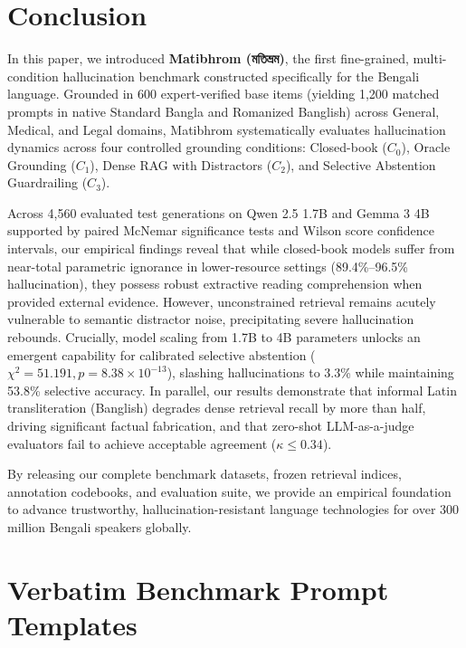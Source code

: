 \documentclass[11pt,a4paper,twocolumn]{article}
\DeclareRobustCommand{\foreignlanguage}[2]{#2}
\let\bengalifont\relax
\DeclareRobustCommand{\foreignlanguage}[2]{{\bengalifont #2}}
\DeclareRobustCommand{\foreignlanguage}[2]{#2}
\begin{document}
\section{Conclusion}
\label{sec:conclusion}

In this paper, we introduced \textbf{Matibhrom (\foreignlanguage{bengali}{মতিভ্রম})}, the first fine-grained, multi-condition hallucination benchmark constructed specifically for the Bengali language. Grounded in 600 expert-verified base items (yielding 1,200 matched prompts in native Standard Bangla and Romanized Banglish) across General, Medical, and Legal domains, Matibhrom systematically evaluates hallucination dynamics across four controlled grounding conditions: Closed-book ($C_0$), Oracle Grounding ($C_1$), Dense RAG with Distractors ($C_2$), and Selective Abstention Guardrailing ($C_3$).

Across 4,560 evaluated test generations on Qwen 2.5 1.7B and Gemma 3 4B supported by paired McNemar significance tests and Wilson score confidence intervals, our empirical findings reveal that while closed-book models suffer from near-total parametric ignorance in lower-resource settings (89.4\%--96.5\% hallucination), they possess robust extractive reading comprehension when provided external evidence. However, unconstrained retrieval remains acutely vulnerable to semantic distractor noise, precipitating severe hallucination rebounds. Crucially, model scaling from 1.7B to 4B parameters unlocks an emergent capability for calibrated selective abstention ($\chi^2 = 51.191, p = 8.38 \times 10^{-13}$), slashing hallucinations to 3.3\% while maintaining 53.8\% selective accuracy. In parallel, our results demonstrate that informal Latin transliteration (Banglish) degrades dense retrieval recall by more than half, driving significant factual fabrication, and that zero-shot LLM-as-a-judge evaluators fail to achieve acceptable agreement ($\kappa \le 0.34$). 

By releasing our complete benchmark datasets, frozen retrieval indices, annotation codebooks, and evaluation suite, we provide an empirical foundation to advance trustworthy, hallucination-resistant language technologies for over 300 million Bengali speakers globally.





\appendix
\section{Verbatim Benchmark Prompt Templates}
\label{sec:appendix_prompts}
\end{document}
